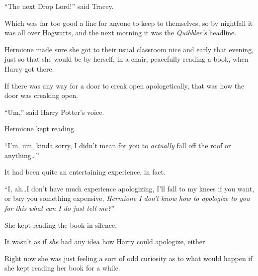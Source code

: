 “The next Drop Lord!” said Tracey.

Which was far too good a line for anyone to keep to themselves, so by nightfall it was all over Hogwarts, and the next morning it was the \emph{Quibbler’s} headline.


Hermione made sure she got to their usual classroom nice and early that evening, just so that she would be by herself, in a chair, peacefully reading a book, when Harry got there.

If there was any way for a door to creak open apologetically, that was how the door was creaking open.

“Um,” said Harry Potter’s voice.

Hermione kept reading.

“I’m, um, kinda sorry, I didn’t mean for you to \emph{actually} fall off the roof or anything…”

It had been quite an entertaining experience, in fact.

“I, ah…I don’t have much experience apologizing, I’ll fall to my knees if you want, or buy you something expensive, \emph{Hermione I don’t know how to apologize to you for this what can I do just tell me?}”

She kept reading the book in silence.

It wasn’t as if \emph{she} had any idea how Harry could apologize, either.

Right now she was just feeling a sort of odd curiosity as to what would happen if she kept reading her book for a while.

